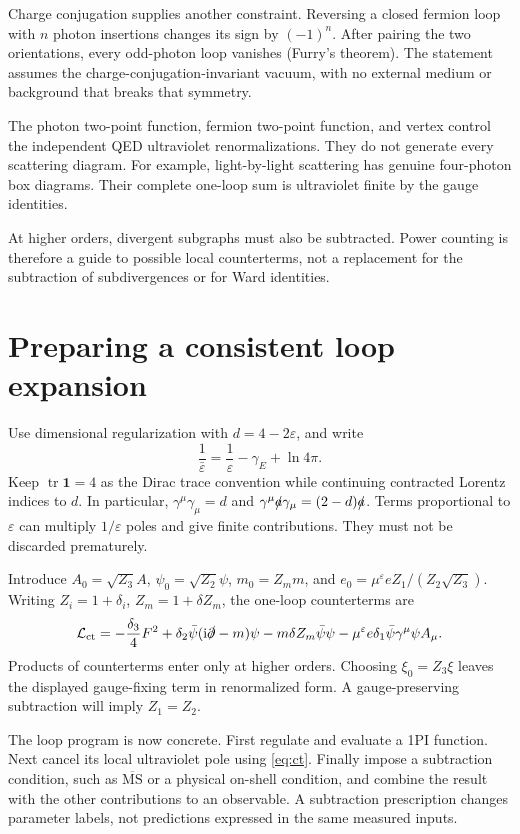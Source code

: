 \documentclass[11pt]{article}
\newcommand{\ii}{\mathrm i}
\newcommand{\eps}{\varepsilon}
\newcommand{\tr}{\operatorname{tr}}
\newcommand{\Lag}{\mathcal L}
\newcommand{\MSbar}{\overline{\mathrm{MS}}}
\newcommand{\module}[1]{\clearpage\section{#1}}
\begin{document}
Charge conjugation supplies another constraint. Reversing a closed
fermion loop with \(n\) photon insertions changes its sign by \((-1)^n\).
After pairing the two orientations, every odd-photon loop vanishes
(Furry's theorem). The statement assumes the charge-conjugation-invariant
vacuum, with no external medium or background that breaks that symmetry.

\begin{keyidea}
The photon two-point function, fermion two-point function, and vertex
control the independent QED ultraviolet renormalizations. They do not
generate every scattering diagram. For example, light-by-light scattering
has genuine four-photon box diagrams. Their complete one-loop sum is
ultraviolet finite by the gauge identities.
\end{keyidea}
At higher orders, divergent subgraphs must also be subtracted. Power
counting is therefore a guide to possible local counterterms, not a
replacement for the subtraction of subdivergences or for Ward identities.

\module{Preparing a consistent loop expansion}
Use dimensional regularization with \(d=4-2\eps\), and write
\begin{equation}
 \frac1{\bar\eps}=\frac1\eps-\gamma_E+\ln4\pi.
\end{equation}
Keep \(\tr\mathbf1=4\) as the Dirac trace convention while continuing
contracted Lorentz indices to \(d\). In particular,
\(\gamma^\mu\gamma_\mu=d\) and
\(\gamma^\mu\slashed a\gamma_\mu=(2-d)\slashed a\).
Terms proportional to \(\eps\) can multiply \(1/\eps\) poles and give
finite contributions. They must not be discarded prematurely.

Introduce \(A_0=\sqrt{Z_3}A\), \(\psi_0=\sqrt{Z_2}\psi\),
\(m_0=Z_m m\), and
\(e_0=\mu^\eps eZ_1/(Z_2\sqrt{Z_3})\). Writing
\(Z_i=1+\delta_i\), \(Z_m=1+\delta Z_m\), the one-loop counterterms are
\begin{equation}
 \Lag_{\rm ct}=-\frac{\delta_3}{4}F^2
 +\delta_2\bar\psi(\ii\slashed\partial-m)\psi
 -m\delta Z_m\bar\psi\psi
 -\mu^\eps e\delta_1\bar\psi\gamma^\mu\psi A_\mu.
 \label{eq:ct}
\end{equation}
Products of counterterms enter only at higher orders. Choosing
\(\xi_0=Z_3\xi\) leaves the displayed gauge-fixing term in renormalized
form. A gauge-preserving subtraction will imply \(Z_1=Z_2\).

The loop program is now concrete. First regulate and evaluate a 1PI
function. Next cancel its local ultraviolet pole using \eqref{eq:ct}.
Finally impose a subtraction condition, such as \(\MSbar\) or a physical
on-shell condition, and combine the result with the other contributions
to an observable. A subtraction prescription changes parameter labels,
not predictions expressed in the same measured inputs.
\end{document}
